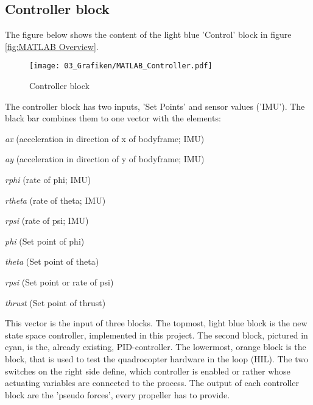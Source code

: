 \subsection{Controller block}\label{chapter_CONTROLLER_BLOCK}
The figure below shows the content of the light blue 'Control' block in figure \ref{fig:MATLAB Overview}.
\begin{figure}[H]
	\centering
		\texttt{[image: 03\_Grafiken/MATLAB\_Controller.pdf]}
	\caption{Controller block}
	\label{fig:Controller block}
\end{figure}
The controller block has two inputs, 'Set Points' and sensor values ('IMU'). The black bar combines them to one vector with the elements:
\begin{enumerate*}
	\item \textit{ax} (acceleration in direction of x of bodyframe; IMU)
	\item \textit{ay} (acceleration in direction of y of bodyframe; IMU)
	\item \textit{rphi} (rate of phi; IMU)
	\item \textit{rtheta} (rate of theta; IMU)
	\item \textit{rpsi} (rate of psi; IMU)
	\item \textit{phi} (Set point of phi)
	\item \textit{theta} (Set point of theta)
	\item \textit{rpsi} (Set point or rate of psi)
	\item \textit{thrust} (Set point of thrust)
\end{enumerate*}
This vector is the input of three blocks. The topmost, light blue block is the new state space controller, implemented in this project. The second block, pictured in cyan, is the, already existing, PID-controller. The lowermost, orange block is the block, that is used to test the quadrocopter hardware in the loop (HIL).
The two switches on the right side define, which controller is enabled or rather whose actuating variables are connected to the process. The output of each controller block are the 'pseudo forces', every propeller has to provide.